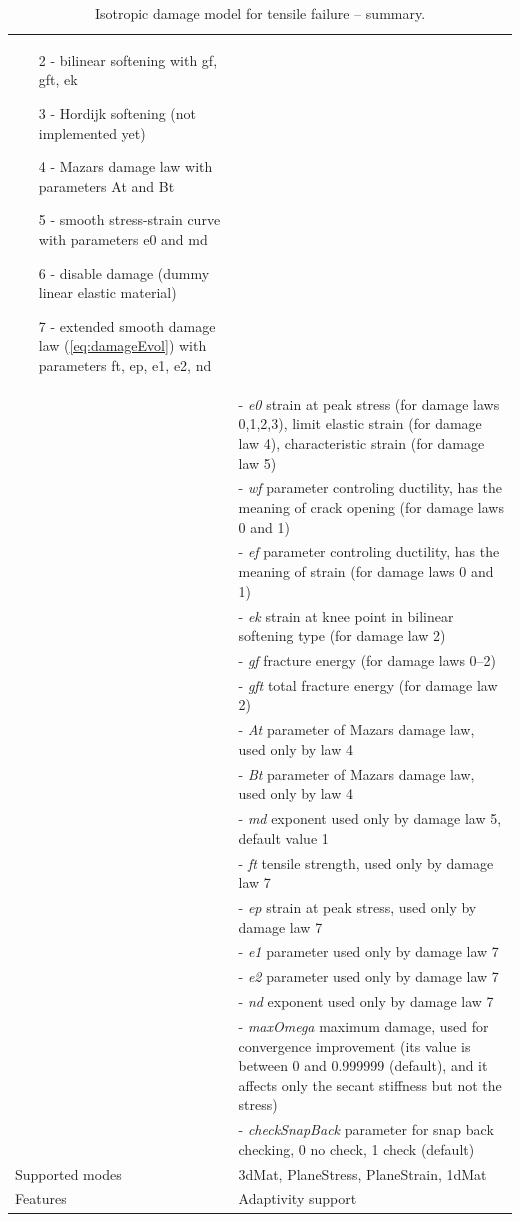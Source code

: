 \documentclass[a4paper]{article}
\newcommand{\param}[1]{{\it #1}}
\begin{document}
\begin{table}[!htb]
\begin{tabular}{|l|p{9cm}|}
\begin{itemize}
\item[2 -] bilinear softening with gf, gft, ek
\item[3 -] Hordijk softening (not implemented yet)
\item[4 -] Mazars damage law with parameters At and Bt
\item[5 -] smooth stress-strain curve with parameters e0 and md
\item[6 -] disable damage (dummy linear elastic material)
\item[7 -] extended smooth damage law (\ref{eq:damageEvol}) with parameters ft, ep, e1, e2, nd
\end{itemize}\\
&- \param{e0} strain at peak stress (for damage laws 0,1,2,3), limit elastic strain (for damage law 4), characteristic strain (for damage law 5)\\
&- \param{wf} parameter controling ductility, has the meaning of crack opening (for damage laws 0 and 1)\\
&- \param{ef} parameter controling ductility, has the meaning of strain (for damage laws 0 and 1)\\
&- \param{ek} strain at knee point in bilinear softening type (for damage law 2)\\
&- \param{gf} fracture energy (for damage laws 0--2)\\
&- \param{gft} total fracture energy (for damage law 2)\\
&- \param{At} parameter of Mazars damage law, used only by law 4\\
&- \param{Bt} parameter of Mazars damage law, used only by law 4\\
&- \param{md} exponent used only by damage law 5, default value 1\\
&- \param{ft} tensile strength, used only by damage law 7\\
&- \param{ep} strain at peak stress, used only by damage law 7\\
&- \param{e1} parameter used only by damage law 7\\
&- \param{e2} parameter used only by damage law 7\\
&- \param{nd} exponent used only by damage law 7\\
&- \param{maxOmega} maximum damage, used for convergence improvement
(its value is between 0 and 0.999999 (default), and it affects only the secant stiffness
but not the stress)\\
&- \param{checkSnapBack} parameter for snap back checking, 0 no check, 1 check (default)\\
Supported modes& 3dMat, PlaneStress, PlaneStrain, 1dMat\\
Features & Adaptivity support\\
\hline
\end{tabular}
\caption{Isotropic damage model for tensile failure -- summary.}
\label{id_table}
\end{table}
\end{document}
